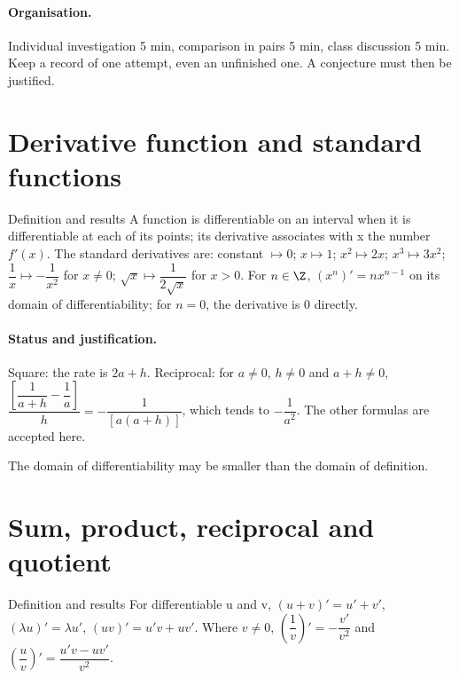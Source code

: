 \paragraph{Organisation.} Individual investigation 5 min, comparison in pairs 5 min, class discussion 5 min. Keep a record of one attempt, even an unfinished one. A conjecture must then be justified.
\section{Derivative function and standard functions}\label{C06-U1}
\begin{repere}{Definition and results}
A function is differentiable on an interval when it is differentiable at each of its points; its derivative associates with x the number $f\prime(x)$. The standard derivatives are: constant $\mapsto0$; $x\mapsto1$; $x^2\mapsto2x$; $x^3\mapsto3x^2$; $\dfrac{1}{x}\mapsto -\dfrac{1}{x^2}$ for $x\ne0$; $\sqrt x\mapsto \dfrac{1}{2\sqrt x}$ for $x>0$. For $n\in\Z$, $(x^n)\prime=nx^{n-1}$ on its domain of differentiability; for $n=0$, the derivative is 0 directly.
\end{repere}
\paragraph{Status and justification.} Square: the rate is $2a+h$. Reciprocal: for $a\ne0$, $h\ne0$ and $a+h\ne0$, $\dfrac{[\dfrac{1}{a+h}-\dfrac{1}{a}]}{h}=-\dfrac{1}{[a(a+h)]}$, which tends to $-\dfrac{1}{a^2}$. The other formulas are accepted here.
\label{C06-EX1}
\begin{erreur}The domain of differentiability may be smaller than the domain of definition.\end{erreur}
\label{C06-AP1}
\section{Sum, product, reciprocal and quotient}\label{C06-U2}
\begin{repere}{Definition and results}
For differentiable u and v, $(u+v)\prime=u\prime+v\prime$, $(\lambda u)\prime=\lambda u\prime$, $(uv)\prime=u\prime v+uv\prime$. Where $v\ne0$, $(\dfrac{1}{v})\prime =-\dfrac{v\prime}{v^2}$ and $(\dfrac{u}{v})\prime =\dfrac{u\prime v-uv\prime}{v^2}$.
\end{repere}
